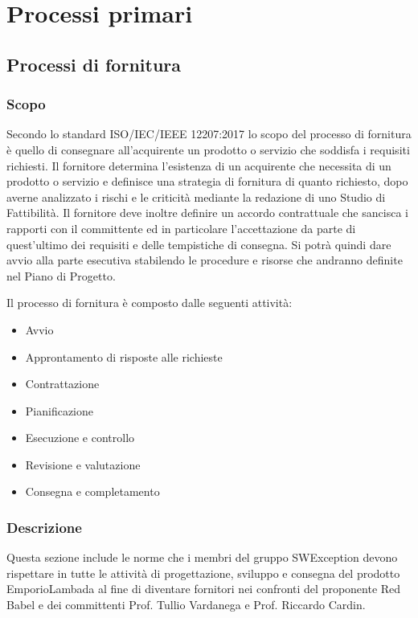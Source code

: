 \section{Processi primari}


\subsection{Processi di fornitura}
\subsubsection{Scopo} 
Secondo lo standard ISO/IEC/IEEE 12207:2017 lo scopo del processo di fornitura è quello di consegnare all'acquirente un prodotto o servizio che soddisfa i requisiti richiesti.  Il fornitore determina l'esistenza di un acquirente che necessita di un prodotto o servizio e definisce una strategia di fornitura di quanto richiesto, dopo averne analizzato i rischi e le criticità mediante la redazione di uno Studio di Fattibilità.
Il fornitore deve inoltre definire un accordo contrattuale che sancisca i rapporti con il committente ed in particolare l'accettazione da parte di quest'ultimo dei requisiti e delle tempistiche di consegna.  Si potrà quindi dare avvio alla parte esecutiva stabilendo le procedure e risorse che andranno definite nel Piano di Progetto.

Il processo di fornitura è composto dalle seguenti attività:
\begin{itemize}
\item Avvio
\item Approntamento di risposte alle richieste
\item Contrattazione
\item Pianificazione
\item Esecuzione e controllo
\item Revisione e valutazione
\item Consegna e completamento
\end{itemize}

\subsubsection{Descrizione}
Questa sezione include le norme che i membri del gruppo SWException devono rispettare in tutte le attività di progettazione, sviluppo e consegna del prodotto EmporioLambada al fine di diventare fornitori nei confronti del proponente Red Babel e dei committenti Prof. Tullio Vardanega e Prof. Riccardo Cardin.
